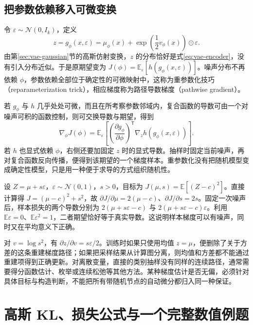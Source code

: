 \documentclass[UTF8,12pt,a4paper,fontset=fandol]{ctexart}
\begin{document}
\subsection{把参数依赖移入可微变换}
令 $\varepsilon\sim\mathcal N(0,I_k)$，定义
\begin{equation}
 z=g_\phi(x,\varepsilon)
   =\mu_\phi(x)+\exp\!\left(\frac12v_\phi(x)\right)\odot\varepsilon.
 \label{eq:vae-reparameterization}
\end{equation}
由第\ref{sec:vae-gaussian}节的高斯仿射变换，$z$ 的分布恰好是式\eqref{eq:vae-encoder}，没有引入分布近似。于是原期望变为 $J(\phi)=\mathbb E_{\varepsilon}[h(g_\phi(x,\varepsilon))]$。噪声分布不再依赖 $\phi$，参数依赖全部位于确定性的可微映射中，这称为重参数化技巧（reparameterization trick），相应梯度称为路径导数梯度（pathwise gradient）。

若 $g_\phi$ 与 $h$ 几乎处处可微，而且在所考察参数邻域内，复合函数的导数可由一个对噪声可积的函数控制，则可交换导数与期望，得到
\begin{equation}
 \nabla_\phi J(\phi)
 =\mathbb E_{\varepsilon}\left[
  \left(\frac{\partial g_\phi}{\partial\phi}\right)^{\!\mathsf T}
  \nabla_z h(g_\phi(x,\varepsilon))\right].
 \label{eq:vae-pathwise-gradient}
\end{equation}
若 $h$ 也显式依赖 $\phi$，右侧还要加固定 $z$ 时的显式导数。抽样时固定当前噪声，再对复合函数反向传播，便得到该期望的一个梯度样本。重参数化没有把随机模型变成确定性模型，只是用一种便于求导的方式组织随机性。

\begin{example}[路径梯度的直接核验]
设 $Z=\mu+s\varepsilon$，$\varepsilon\sim\mathcal N(0,1)$，$s>0$，目标为 $J(\mu,s)=\mathbb E[(Z-c)^2]$。直接计算得 $J=(\mu-c)^2+s^2$，故 $\partial J/\partial\mu=2(\mu-c)$、$\partial J/\partial s=2s$。固定一次噪声后，样本损失的两个导数分别为 $2(\mu+s\varepsilon-c)$ 与 $2(\mu+s\varepsilon-c)\varepsilon$。利用 $\mathbb E\varepsilon=0$、$\mathbb E\varepsilon^2=1$，二者期望恰好等于真实导数。这说明样本梯度可以有噪声，同时又在平均意义下正确。
\end{example}

对 $v=\log s^2$，有 $\partial z/\partial v=s\varepsilon/2$。训练时如果只使用均值 $z=\mu$，便删除了关于方差的这条重建梯度路径；如果把采样结果从计算图分离，则均值和方差都不能通过重建项得到正确更新。对离散变量，直接的类别抽样没有同样的连续路径，通常需要得分函数估计、枚举或连续松弛等其他方法。某种梯度估计是否无偏，必须针对具体目标与构造判断，不能把所有带随机节点的自动微分都归入同一种保证。

\section{高斯 KL、损失公式与一个完整数值例题}
\label{sec:vae-closed-form}
\end{document}
